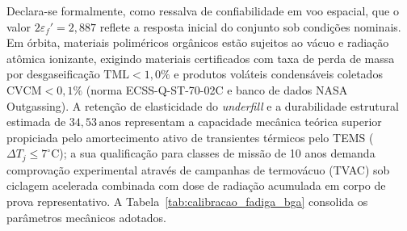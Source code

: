 Declara-se formalmente, como ressalva de confiabilidade em voo espacial, que o valor $2\varepsilon_f' = 2{,}887$ reflete a resposta inicial do conjunto sob condições nominais. Em órbita, materiais poliméricos orgânicos estão sujeitos ao vácuo e radiação atômica ionizante, exigindo materiais certificados com taxa de perda de massa por desgaseificação $\text{TML} < 1{,}0\%$ e produtos voláteis condensáveis coletados $\text{CVCM} < 0{,}1\%$ (norma ECSS-Q-ST-70-02C e banco de dados NASA Outgassing). A retenção de elasticidade do \textit{underfill} e a durabilidade estrutural estimada de $34{,}53\,\mathrm{anos}$ representam a capacidade mecânica teórica superior propiciada pelo amortecimento ativo de transientes térmicos pelo TEMS ($\Delta T_j \le 7^\circ\text{C}$); a sua qualificação para classes de missão de 10 anos demanda comprovação experimental através de campanhas de termovácuo (TVAC) sob ciclagem acelerada combinada com dose de radiação acumulada em corpo de prova representativo. A Tabela~\ref{tab:calibracao_fadiga_bga} consolida os parâmetros mecânicos adotados.

\begin{table}[!ht]
\centering
\small
\renewcommand{\arraystretch}{0.85}
\caption{Parâmetros termomecânicos e coeficientes de calibração para juntas BGA SAC305.}
\label{tab:calibracao_fadiga_bga}
\end{table}

